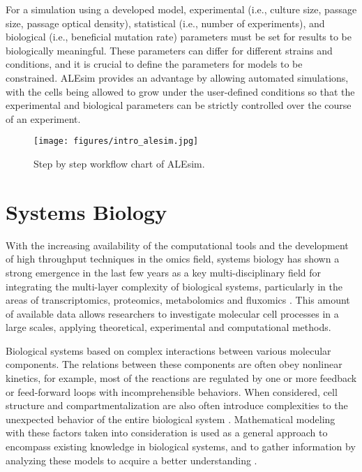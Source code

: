 For a simulation using a developed model, experimental (i.e., culture size, passage size, passage optical density), statistical (i.e., number of experiments), and biological (i.e., beneficial mutation rate) parameters must be set for results to be biologically meaningful. These parameters can differ for different strains and conditions, and it is crucial to define the parameters for models to be constrained. ALEsim provides an advantage by allowing automated simulations, with the cells being allowed to grow under the user-defined conditions so that the experimental and biological parameters can be strictly controlled over the course of an experiment.

\begin{figure}[H]
\begin{center}
\texttt{[image: figures/intro\_alesim.jpg]}
\caption[Step by step workflow chart of ALEsim\cite{lacroix2017model}.]{Step by step workflow chart of ALEsim\cite{lacroix2017model}.}
\label{fig:intro_alesim}
\end{center}
\end{figure}


\section{Systems Biology}
With the increasing availability of the computational tools and the development of high throughput techniques in the omics field, systems biology has shown a strong emergence in the last few years as a key multi-disciplinary field for integrating the multi-layer complexity of biological systems, particularly in the areas of transcriptomics, proteomics, metabolomics and fluxomics \cite{kitano2002systems}. This amount of available data allows researchers to investigate molecular cell processes in a large scales, applying theoretical, experimental and computational methods.

Biological systems based on complex interactions between various molecular components. The relations between these components are often obey nonlinear kinetics, for example, most of the reactions are regulated by one or more feedback or feed-forward loops with incomprehensible behaviors. When considered, cell structure and compartmentalization are also often introduce complexities to the unexpected behavior of the entire biological system \cite{bellouquid2006mathematical}. Mathematical modeling with these factors taken into consideration is used as a general approach to encompass existing knowledge in biological systems, and to gather information by analyzing these models to acquire a better understanding \cite{kremling2013systems}.

